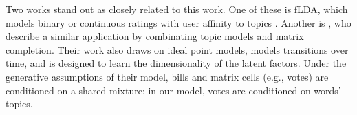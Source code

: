 Two works stand out as closely related to this work.  One of these is
fLDA, which models binary or continuous ratings with user affinity to
topics \citep{agarwal:2010}.  Another is \cite{wang:2010}, who
describe a similar application by combinating topic models and matrix
completion.  Their work also draws on ideal point models, models
transitions over time, and is designed to learn the dimensionality of
the latent factors.  Under the generative assumptions of their model,
bills and matrix cells (e.g., votes) are conditioned on a shared
mixture; in our model, votes are conditioned on words' topics.








